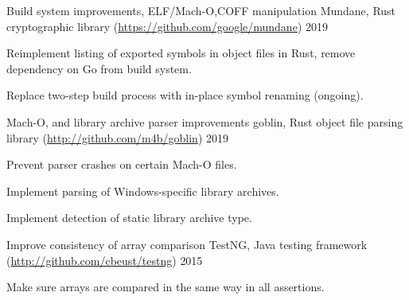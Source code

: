 

\begin{cventries}

  \cventry
    {Build system improvements, ELF/Mach-O,COFF manipulation} %
    {Mundane, Rust cryptographic library (\url{https://github.com/google/mundane})} %
    {} %
    {2019} %
    {
      \begin{cvitems} %
        \item {Reimplement listing of exported symbols in object files in Rust, remove dependency on Go from build system.}
        \item {Replace two-step build process with in-place symbol renaming (ongoing).}
      \end{cvitems}
    }

  \cventry
    {Mach-O, and library archive parser improvements} %
    {goblin, Rust object file parsing library (\url{http://github.com/m4b/goblin})} %
    {} %
    {2019} %
    {
      \begin{cvitems} %
        \item {Prevent parser crashes on certain Mach-O files.}
        \item {Implement parsing of Windows-specific library archives.}
        \item {Implement detection of static library archive type.}
      \end{cvitems}
    }

  \cventry
    {Improve consistency of array comparison} %
    {TestNG, Java testing framework (\url{http://github.com/cbeust/testng})} %
    {} %
    {2015} %
    {
      \begin{cvitems} %
        \item {Make sure arrays are compared in the same way in all assertions.}
      \end{cvitems}
    }

\end{cventries}
